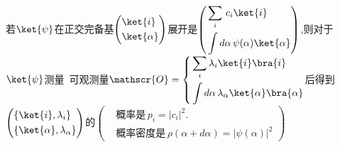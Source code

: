 若$\ket{\psi}$在正交完备基$\left(\begin{aligned}
        &\ket{i}\\&\ket{\alpha}
    \end{aligned}\right)$展开是$\left(\begin{aligned}
        &\sum_{i}\,c_i \ket{i}\\&\int d\alpha\,\psi(\alpha)\ket{\alpha}
    \end{aligned}\right)$,则对于$\ket{\psi}$测量\, 可观测量$\mathscr{O}=
            \left\{\begin{aligned}
            &\sum_{i} \lambda_i\ket{i}\bra{i}\\
            &\int d\alpha\,\lambda_\alpha\ket{\alpha}\bra{\alpha}
            \end{aligned}\right.$后得到$\left(\begin{aligned}
        &\{\ket{i},\lambda_i\}\\ &\{\ket{\alpha},\lambda_\alpha\}
    \end{aligned}\right)$的$\left(
        \begin{aligned}
        &\text{概率是}\,p_i = |c_i|^2.\\
        &\text{概率密度是}\,\rho(\alpha+d\alpha)=|\psi(\alpha)|^2
        \end{aligned}
    \right)$



